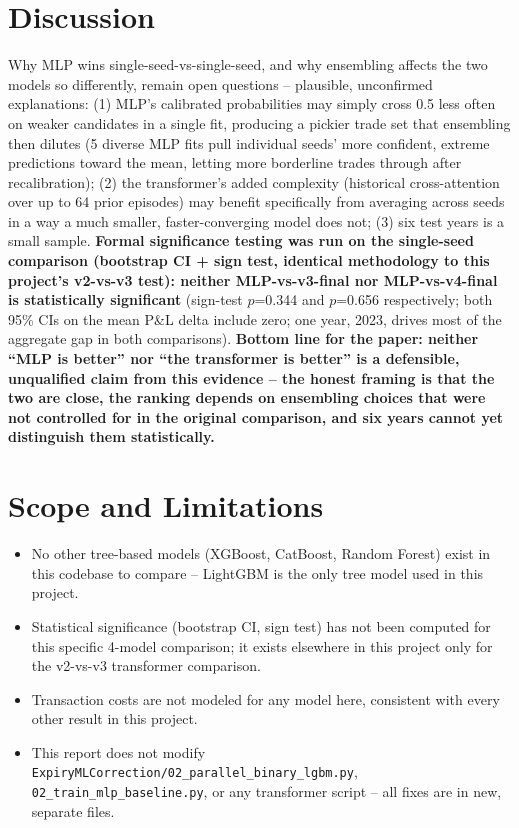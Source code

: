 \documentclass[11pt]{article}
\begin{document}
\section{Discussion}
Why MLP wins single-seed-vs-single-seed, and why ensembling affects the two models so differently, remain
open questions -- plausible, unconfirmed explanations: (1) MLP's calibrated probabilities may simply cross
0.5 less often on weaker candidates in a single fit, producing a pickier trade set that ensembling then
dilutes (5 diverse MLP fits pull individual seeds' more confident, extreme predictions toward the mean,
letting more borderline trades through after recalibration); (2) the transformer's added complexity
(historical cross-attention over up to 64 prior episodes) may benefit specifically from averaging across
seeds in a way a much smaller, faster-converging model does not; (3) six test years is a small sample.
\textbf{Formal significance testing was run on the single-seed comparison (bootstrap CI + sign test,
identical methodology to this project's v2-vs-v3 test): neither MLP-vs-v3-final nor MLP-vs-v4-final is
statistically significant} (sign-test $p$=0.344 and $p$=0.656 respectively; both 95\% CIs on the mean P\&L
delta include zero; one year, 2023, drives most of the aggregate gap in both comparisons).
\textbf{Bottom line for the paper: neither ``MLP is better'' nor ``the transformer is better'' is a
defensible, unqualified claim from this evidence -- the honest framing is that the two are close, the
ranking depends on ensembling choices that were not controlled for in the original comparison, and six
years cannot yet distinguish them statistically.}

\section{Scope and Limitations}
\begin{itemize}
\item No other tree-based models (XGBoost, CatBoost, Random Forest) exist in this codebase to compare --
LightGBM is the only tree model used in this project.
\item Statistical significance (bootstrap CI, sign test) has not been computed for this specific 4-model
comparison; it exists elsewhere in this project only for the v2-vs-v3 transformer comparison.
\item Transaction costs are not modeled for any model here, consistent with every other result in this project.
\item This report does not modify \texttt{ExpiryMLCorrection/02\_parallel\_binary\_lgbm.py},
\texttt{02\_train\_mlp\_baseline.py}, or any transformer script -- all fixes are in new, separate files.
\end{itemize}
\end{document}
